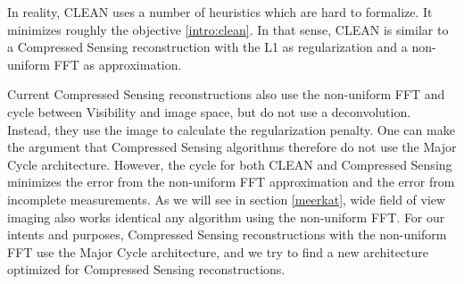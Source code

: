 In reality, CLEAN uses a number of heuristics which are hard to formalize. It minimizes roughly the objective \eqref{intro:clean}. In that sense, CLEAN is similar to a Compressed Sensing reconstruction with the L1 as regularization and a non-uniform FFT as approximation.

Current Compressed Sensing reconstructions also use the non-uniform FFT and cycle between Visibility and image space\cite{girard2015sparse,dabbech2018cygnus}, but do not use a deconvolution. Instead, they use the image to calculate the regularization penalty. One can make the argument that Compressed Sensing algorithms therefore do not use the Major Cycle architecture. However, the cycle for both CLEAN and Compressed Sensing minimizes the error from the non-uniform FFT approximation and the error from incomplete measurements. As we will see in section \ref{meerkat}, wide field of view imaging also works identical any algorithm using the non-uniform FFT. For our intents and purposes, Compressed Sensing reconstructions with the non-uniform FFT use the Major Cycle architecture, and we try to find a new architecture optimized for Compressed Sensing reconstructions.

 






